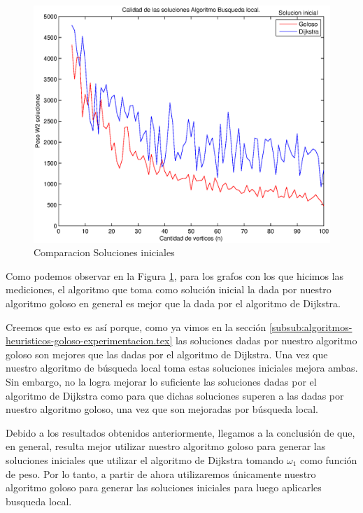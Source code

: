 \begin{figure}[H]
  \begin{minipage}{0.5\linewidth}
    \includegraphics[width=\linewidth]{graficos/busq_local_calidad.eps}
    \caption{Comparacion Soluciones iniciales}\label{fig:busq-local-calidad}
  \end{minipage}
\end{figure}
  
Como podemos observar en la Figura \ref{fig:busq-local-calidad}, para los grafos con los que hicimos las mediciones, el algoritmo que toma como solución inicial la dada por nuestro algoritmo goloso en general es mejor que la dada por el algoritmo de Dijkstra.

Creemos que esto es así porque, como ya vimos en la sección \ref{subsub:algoritmos-heuristicos-goloso-experimentacion.tex} las soluciones dadas por nuestro algoritmo goloso son mejores que las dadas por el algoritmo de Dijkstra. Una vez que nuestro algoritmo de búsqueda local toma estas soluciones iniciales mejora ambas. Sin embargo, no la logra mejorar lo suficiente las soluciones dadas por el algoritmo de Dijkstra como para que dichas soluciones superen a las dadas por nuestro algoritmo goloso, una vez que son mejoradas por búsqueda local.

Debido a los resultados obtenidos anteriormente, llegamos a la conclusión de que, en general, resulta mejor utilizar nuestro algoritmo goloso para generar las soluciones iniciales que utilizar el algoritmo de Dijkstra tomando $\omega_1$ como función de peso. Por lo tanto, a partir de ahora utilizaremos únicamente nuestro algoritmo goloso para generar las soluciones iniciales para luego aplicarles busqueda local.